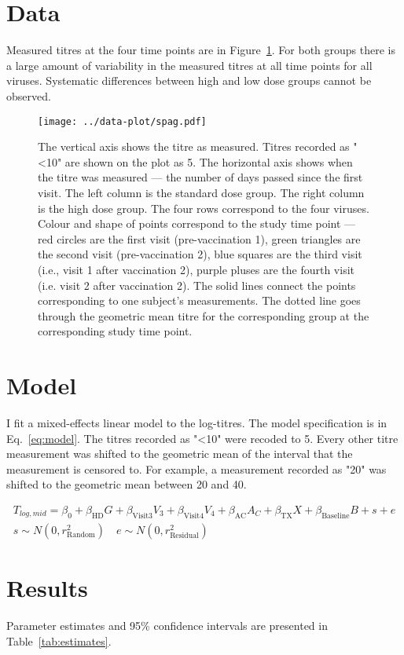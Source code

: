 \documentclass[11pt]{article}
\begin{document}
\section{Data}

Measured titres at the four time points are in Figure~\ref{fig:spag}.
For both groups there is a large amount of variability in the measured titres
at all time points for all viruses. Systematic differences between high and
low dose groups cannot be observed.

\begin{figure}[htp]
    \centering
    \texttt{[image: ../data-plot/spag.pdf]}
    \caption{
        The vertical axis shows the titre as measured.
        Titres recorded as "<10" are shown on the plot as 5.
        The horizontal axis shows when the titre was measured --- the number of
        days passed since the first visit.
        The left column is the standard dose group.
        The right column is the high dose group.
        The four rows correspond to the four viruses.
        Colour and shape of points correspond to the study time point ---
        red circles are the first visit (pre-vaccination 1),
        green triangles are the second visit (pre-vaccination 2),
        blue squares are the third visit (i.e., visit 1 after vaccination 2),
        purple pluses are the fourth visit (i.e. visit 2 after vaccination 2).
        The solid lines connect the points
        corresponding to one subject's measurements.
        The dotted line goes through the geometric mean titre for the
        corresponding group at the corresponding study time point.
    }
    \label{fig:spag}
\end{figure}

\section{Model}

I fit a mixed-effects linear model to the log-titres.
The model specification is in Eq.~\ref{eq:model}.
The titres recorded as "<10" were recoded to 5. Every other titre measurement
was shifted to the geometric mean of the interval that the measurement
is censored to. For example, a measurement recorded as "20" was shifted to the
geometric mean between 20 and 40.

\begin{gather}
    \label{eq:model}
    T_{log,mid} = \beta_0 + \beta_{\text{HD}}G + \beta_{\text{Visit3}}V_3
    + \beta_{\text{Visit4}}V_4 + \beta_{\text{AC}}A_C
    + \beta_{\text{TX}}X + \beta_{\text{Baseline}}B
    + s + e\\
    s \sim N(0, r^2_{\text{Random}}) \quad e \sim N(0, r^2_{\text{Residual}})
\end{gather}

\section{Results}

Parameter estimates and 95\% confidence intervals
are presented in Table~\ref{tab:estimates}.


\end{document}
